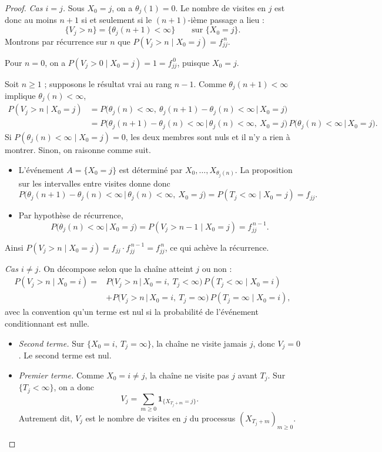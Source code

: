 \begin{proof}
\emph{Cas $i=j$.} Sous $X_0=j$, on a $\theta_j(1)=0$. Le nombre de visites en $j$ est donc au moins $n+1$ si et seulement si le $(n+1)$-ième passage a lieu :
\[
\{V_j>n\}=\{\theta_j(n+1)<\infty\}\qquad\text{sur }\{X_0=j\}.
\]
Montrons par récurrence sur $n$ que $P(V_j>n\mid X_0=j)=f_{jj}^{\,n}$.

Pour $n=0$, on a $P(V_j>0\mid X_0=j)=1=f_{jj}^{\,0}$, puisque $X_0=j$.

Soit $n\ge1$ ; supposons le résultat vrai au rang $n-1$. Comme $\theta_j(n+1)<\infty$ implique $\theta_j(n)<\infty$,
\begin{align*}
P(V_j>n\mid X_0=j)
&=P\big(\theta_j(n)<\infty,\ \theta_j(n+1)-\theta_j(n)<\infty\,\big|\,X_0=j\big)\\
&=P\big(\theta_j(n+1)-\theta_j(n)<\infty\,\big|\,\theta_j(n)<\infty,\ X_0=j\big)\,
  P\big(\theta_j(n)<\infty\,\big|\,X_0=j\big).
\end{align*}
Si $P(\theta_j(n)<\infty\mid X_0=j)=0$, les deux membres sont nuls et il n'y a rien à montrer. Sinon, on raisonne comme suit.
\begin{itemize}
\item L'événement $A=\{X_0=j\}$ est déterminé par $X_0,\dots,X_{\theta_j(n)}$. La proposition sur les intervalles entre visites donne donc
\[
P\big(\theta_j(n+1)-\theta_j(n)<\infty\,\big|\,\theta_j(n)<\infty,\ X_0=j\big)
=P(T_j<\infty\mid X_0=j)=f_{jj}.
\]
\item Par hypothèse de récurrence,
\[
P\big(\theta_j(n)<\infty\,\big|\,X_0=j\big)=P(V_j>n-1\mid X_0=j)=f_{jj}^{\,n-1}.
\]
\end{itemize}
Ainsi $P(V_j>n\mid X_0=j)=f_{jj}\cdot f_{jj}^{\,n-1}=f_{jj}^{\,n}$, ce qui achève la récurrence.

\emph{Cas $i\neq j$.} On décompose selon que la chaîne atteint $j$ ou non :
\begin{align*}
P(V_j>n\mid X_0=i)
={}&P\big(V_j>n\,\big|\,X_0=i,\ T_j<\infty\big)\,P(T_j<\infty\mid X_0=i)\\
&+P\big(V_j>n\,\big|\,X_0=i,\ T_j=\infty\big)\,P(T_j=\infty\mid X_0=i),
\end{align*}
avec la convention qu'un terme est nul si la probabilité de l'événement conditionnant est nulle.
\begin{itemize}
\item \emph{Second terme.} Sur $\{X_0=i,\ T_j=\infty\}$, la chaîne ne visite jamais $j$, donc $V_j=0$. Le second terme est nul.
\item \emph{Premier terme.} Comme $X_0=i\neq j$, la chaîne ne visite pas $j$ avant $T_j$. Sur $\{T_j<\infty\}$, on a donc
\[
V_j=\sum_{m\ge0}\mathbf 1_{\{X_{T_j+m}=j\}}.
\]
Autrement dit, $V_j$ est le nombre de visites en $j$ du processus $(X_{T_j+m})_{m\ge0}$.


\end{itemize}
\end{proof}
